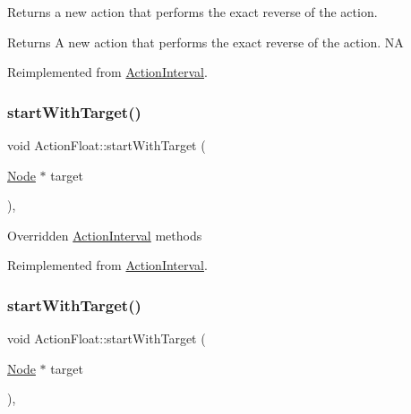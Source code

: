 Returns a new action that performs the exact reverse of the action.

\begin{DoxyReturn}{Returns}
A new action that performs the exact reverse of the action.  NA 
\end{DoxyReturn}


Reimplemented from \hyperlink{classActionInterval_a9f9ac7164036a0bc261a72f62a2b2da7}{Action\+Interval}.

\mbox{\label{classActionFloat_a898675a5b5c372d44abec94d55632ae0}} 
\subsubsection{\texorpdfstring{start\+With\+Target()}{startWithTarget()}\hspace{0.1cm}{\footnotesize\ttfamily [1/2]}}
{\footnotesize\ttfamily void Action\+Float\+::start\+With\+Target (\begin{DoxyParamCaption}\item[{\hyperlink{classNode}{Node} $\ast$}]{target }\end{DoxyParamCaption})\hspace{0.3cm}{\ttfamily [override]}, {\ttfamily [virtual]}}

Overridden \hyperlink{classActionInterval}{Action\+Interval} methods 

Reimplemented from \hyperlink{classActionInterval_ad3d91186b2c3108488ddbbdbbd982484}{Action\+Interval}.

\mbox{\label{classActionFloat_a898675a5b5c372d44abec94d55632ae0}} 
\subsubsection{\texorpdfstring{start\+With\+Target()}{startWithTarget()}\hspace{0.1cm}{\footnotesize\ttfamily [2/2]}}
{\footnotesize\ttfamily void Action\+Float\+::start\+With\+Target (\begin{DoxyParamCaption}\item[{\hyperlink{classNode}{Node} $\ast$}]{target }\end{DoxyParamCaption})\hspace{0.3cm}{\ttfamily [override]}, {\ttfamily [virtual]}}

